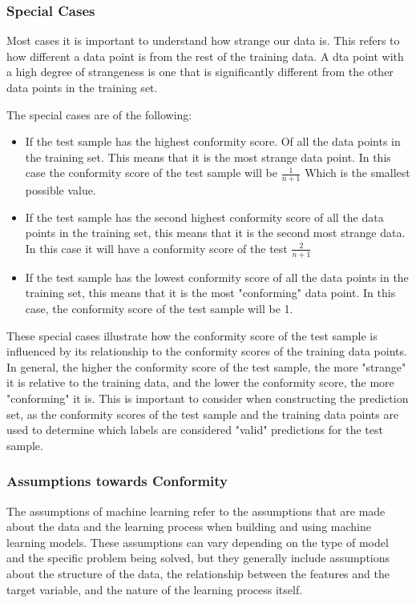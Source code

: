 \subsubsection{Special Cases}
Most cases it is important to understand how strange our data is. This refers to how different a data point is from the rest of the training data. A dta point with a high degree of strangeness is one that is significantly different from the other data points in the training set.

The special cases are of the following: 
\begin{itemize}
	\item If the test sample has the highest conformity score. Of all the data points in the training set. This means that it is the most strange data point. In this case the conformity score of the test sample will be $ \frac{1}{n+1} $ Which is the smallest possible value.
	\item If the test sample has the second highest conformity score of all the data points in the training set, this means that it is the second most strange data. In this case it will have a conformity score of the test
	      $\frac{2}{n+1}$
	\item If the test sample has the lowest conformity score of all the data points in the training set, this means that it is the most "conforming" data point. In this case, the conformity score of the test sample will be 1.

\end{itemize}
These special cases illustrate how the conformity score of the test sample is influenced by its relationship to the conformity scores of the training data points. In general, the higher the conformity score of the test sample, the more "strange" it is relative to the training data, and the lower the conformity score, the more "conforming" it is. This is important to consider when constructing the prediction set, as the conformity scores of the test sample and the training data points are used to determine which labels are considered "valid" predictions for the test sample.

\subsubsection{Assumptions towards Conformity}
The assumptions of machine learning refer to the assumptions that are made about the data and the learning process when building and using machine learning models. These assumptions can vary depending on the type of model and the specific problem being solved, but they generally include assumptions about the structure of the data, the relationship between the features and the target variable, and the nature of the learning process itself.

